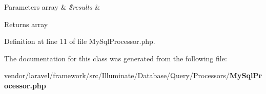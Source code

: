 \begin{DoxyParams}[1]{Parameters}
array & {\em \$results} & \\
\hline
\end{DoxyParams}
\begin{DoxyReturn}{Returns}
array 
\end{DoxyReturn}


Definition at line 11 of file My\+Sql\+Processor.\+php.



The documentation for this class was generated from the following file\+:\begin{DoxyCompactItemize}
\item 
vendor/laravel/framework/src/\+Illuminate/\+Database/\+Query/\+Processors/{\bf My\+Sql\+Processor.\+php}\end{DoxyCompactItemize}

